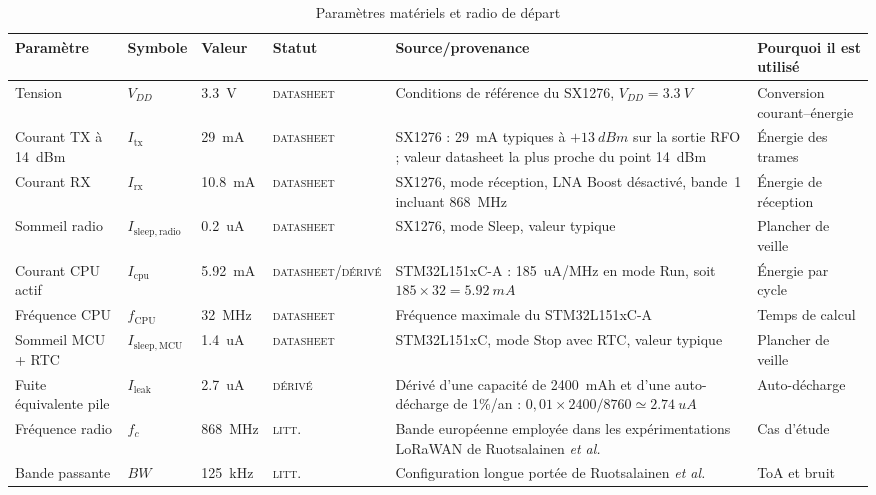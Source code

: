 \documentclass[conference,a4paper]{IEEEtran}
\newcommand{\statusData}{\textsc{datasheet}}
\newcommand{\statusLit}{\textsc{litt.}}
\newcommand{\statusDer}{\textsc{dérivé}}
\begin{document}
\begin{table}[H]
\caption{Paramètres matériels et radio de départ}
\label{tab:params-hw}
\centering\scriptsize
\begin{tabularx}{\textwidth}{@{}l l l l Y Y@{}}
\toprule
Paramètre & Symbole & Valeur & Statut & Source/provenance & Pourquoi il est utilisé \\
\midrule
Tension & $V_{DD}$ & \SI{3.3}{V} & \statusData{} & Conditions de référence du SX1276, $V_{DD}=\SI{3.3}{V}$ \cite[Sec.~2.5, Tab.~6]{sx1276ds} & Conversion courant--énergie \\
Courant TX à \SI{14}{dBm} & $I_{\mathrm{tx}}$ & \SI{29}{mA} & \statusData{} & SX1276 : \SI{29}{mA} typiques à $+\SI{13}{dBm}$ sur la sortie RFO ; valeur datasheet la plus proche du point \SI{14}{dBm} \cite[Sec.~2.5.1, Tab.~6]{sx1276ds} & Énergie des trames \\
Courant RX & $I_{\mathrm{rx}}$ & \SI{10.8}{mA} & \statusData{} & SX1276, mode réception, LNA Boost désactivé, bande~1 incluant \SI{868}{MHz} \cite[Sec.~2.5.1, Tab.~6]{sx1276ds} & Énergie de réception \\
Sommeil radio & $I_{\mathrm{sleep,radio}}$ & \SI{0.2}{uA} & \statusData{} & SX1276, mode Sleep, valeur typique \cite[Sec.~2.5.1, Tab.~6]{sx1276ds} & Plancher de veille \\
Courant CPU actif & $I_{\mathrm{cpu}}$ & \SI{5.92}{mA} & \statusData{}/\statusDer{} & STM32L151xC-A : \SI{185}{uA/MHz} en mode Run, soit $185\times32=\SI{5.92}{mA}$ \cite{stml1ds} & Énergie par cycle \\
Fréquence CPU & $f_{\mathrm{CPU}}$ & \SI{32}{MHz} & \statusData{} & Fréquence maximale du STM32L151xC-A \cite{stml1ds} & Temps de calcul \\
Sommeil MCU + RTC & $I_{\mathrm{sleep,MCU}}$ & \SI{1.4}{uA} & \statusData{} & STM32L151xC, mode Stop avec RTC, valeur typique \cite{stml1ds} & Plancher de veille \\
Fuite équivalente pile & $I_{\mathrm{leak}}$ & \SI{2.7}{uA} & \statusDer{} & Dérivé d'une capacité de \SI{2400}{mAh} et d'une auto-décharge de 1\%/an : $0{,}01\times2400/8760\simeq\SI{2.74}{uA}$ & Auto-décharge \\
Fréquence radio & $f_c$ & \SI{868}{MHz} & \statusLit{} & Bande européenne employée dans les expérimentations LoRaWAN de Ruotsalainen \emph{et al.} \cite{ruotsalainen2020} & Cas d'étude \\
Bande passante & $BW$ & \SI{125}{kHz} & \statusLit{} & Configuration longue portée de Ruotsalainen \emph{et al.} \cite[Sec.~V-C]{ruotsalainen2020} & ToA et bruit \\

\end{tabularx}
\end{table}
\end{document}
